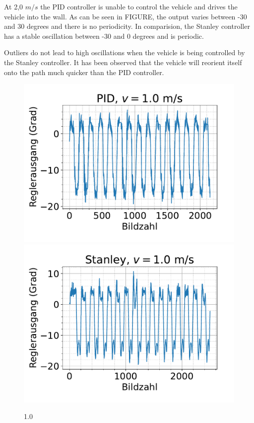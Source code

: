 \documentclass[arbeit=studie,oneside,BCOR=12mm]{ArbeitRST}
\begin{document}
At 2,0 $m/s$ the PID controller is unable to control the vehicle and
drives the vehicle into the wall. As can be seen in FIGURE, the output varies
between -30 and 30 degrees and there is no periodicity. In comparision, the
Stanley controller has a stable oscillation between -30 and 0 degrees and is
periodic.

Outliers do not lead to high oscillations when the vehicle is being controlled
by the Stanley controller. It has been observed that the vehicle will reorient
itself onto the path much quicker than the PID controller.

\begin{figure}[h]
    \centering
    \includegraphics[scale=0.47]{pid1.0}
    \includegraphics[scale=0.47]{Stan1.0}
    \caption{1.0}
    \label{ausrei}
\end{figure}
\end{document}
